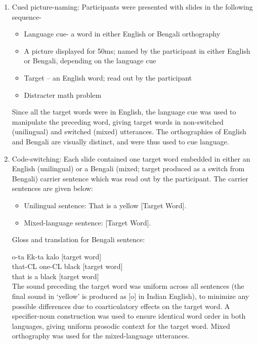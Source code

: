 \documentclass[charis,linguex]{glossa}
\begin{document}
\begin{enumerate}[]
	\item Cued picture-naming: Participants were presented with slides in the following sequence-
	\begin{itemize}
		\item Language cue- a word in either English or Bengali orthography
		\item A picture displayed for 50ms; named by the participant in either English or Bengali, depending on the language cue 
		\item Target -- an English word; read out by the participant
		\item Distracter math problem
	\end{itemize}
	Since all the target words were in English, the language cue was used to manipulate the preceding word, giving target words in non-switched (unilingual) and switched (mixed) utterances. The orthographies of English and Bengali are visually distinct, and were thus used to cue language.
	
	\item Code-switching: Each slide contained one target word embedded in either an English (unilingual) or a Bengali (mixed; target produced as a switch from Bengali) carrier sentence which was read out by the participant. The carrier sentences are given below:
	\begin{itemize}
		\item Unilingual sentence: That is a yellow [Target Word].
		\item Mixed-language sentence:  [Target Word]. 
	\end{itemize}
	
Gloss and translation for Bengali sentence:

	o-ta \quad Ek-ta \quad kalo [target word]\\
	that-CL one-CL black [target word]\\
	that is a black [target word]\\

	The sound preceding the target word was uniform across all sentences (the final sound in `yellow' is produced as [o] in Indian English), to minimize any possible differences due to coarticulatory effects on the target word. A specifier-noun construction was used to ensure identical word order in both languages, giving uniform prosodic context for the target word. Mixed orthography was used for the mixed-language utterances. \\
	
\end{enumerate}
\end{document}

